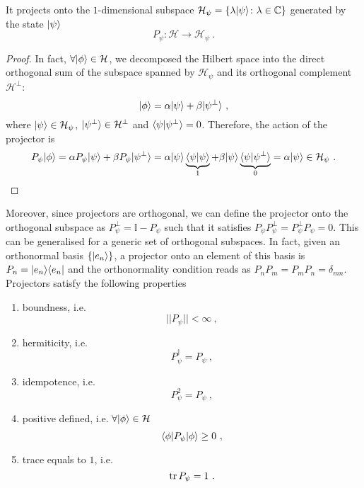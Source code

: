     It projects onto the $1$-dimensional subspace $\mathcal H_\psi = \{\lambda \vert\psi\rangle \colon \lambda \in \mathbb C\}$ generated by the state $\vert\psi\rangle$
    \begin{equation*}
        P_\psi \colon \mathcal H \rightarrow \mathcal H_\psi ~.
    \end{equation*}
    \begin{proof}
        In fact, $\forall \vert\phi\rangle \in \mathcal H$, we decomposed the Hilbert space into the direct orthogonal sum of the subspace spanned by $\mathcal H_{\psi}$ and its orthogonal complement $\mathcal H^\perp$:
        \begin{equation*}
            \vert\phi\rangle = \alpha \vert\psi\rangle + \beta \vert\psi^\perp\rangle ~,
        \end{equation*}
        where $\vert\psi\rangle \in \mathcal H_\psi$, $\vert\psi^\perp\rangle \in \mathcal H^\perp$ and $\langle\psi\vert\psi^\perp\rangle = 0$. Therefore, the action of the projector is
        \begin{equation*}
            P_\psi \vert\phi\rangle = \alpha P_\psi \vert\psi\rangle + \beta P_\psi \vert\psi^\perp\rangle = \alpha \vert\psi\rangle \underbrace{\langle\psi\vert\psi\rangle}_1 + \beta \vert\psi\rangle \underbrace{\langle\psi\vert\psi^\perp\rangle}_0 = \alpha \vert\psi\rangle \in \mathcal H_\psi ~.
        \end{equation*}
    \end{proof}
    Moreover, since projectors are orthogonal, we can define the projector onto the orthogonal subspace as $P_\psi^\perp = \mathbb I - P_\psi$ such that it satisfies $P_\psi P_\psi^\perp = P_\psi^\perp P_\psi = 0$. This can be generalised for a generic set of orthogonal subspaces. In fact, given an orthonormal basis $\{\vert e_n\rangle\}$, a projector onto an element of this basis is $P_n = \vert e_n\rangle \langle e_n\vert$ and the orthonormality condition reads as $P_n P_m = P_m P_n = \delta_{mn}$. Projectors satisfy the following properties 
    \begin{enumerate}
        \item boundness, i.e. 
            \begin{equation*}
                ||P_\psi|| < \infty~,
            \end{equation*}
        \item hermiticity, i.e. 
            \begin{equation*}
                P_\psi^\dagger = P_\psi ~,
            \end{equation*}
        \item idempotence, i.e. 
            \begin{equation}\label{idem}
                P_\psi^2 = P_\psi ~,
            \end{equation}
        \item positive defined, i.e. $\forall \vert\phi\rangle \in \mathcal H$
            \begin{equation*}
                \langle\phi\vert P_\psi \vert\phi\rangle \geq 0 ~,
            \end{equation*}
        \item trace equals to $1$, i.e. 
            \begin{equation*}
                \operatorname{tr} P_\psi = 1 ~.
            \end{equation*}
    \end{enumerate}
